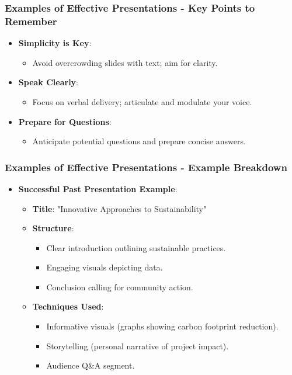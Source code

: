 \documentclass[aspectratio=169]{beamer}
\begin{document}
\begin{frame}[fragile]
    \frametitle{Examples of Effective Presentations - Key Points to Remember}
    \begin{itemize}
        \item \textbf{Simplicity is Key}:
            \begin{itemize}
                \item Avoid overcrowding slides with text; aim for clarity.
            \end{itemize}
        \item \textbf{Speak Clearly}:
            \begin{itemize}
                \item Focus on verbal delivery; articulate and modulate your voice.
            \end{itemize}
        \item \textbf{Prepare for Questions}:
            \begin{itemize}
                \item Anticipate potential questions and prepare concise answers.
            \end{itemize}
    \end{itemize}
\end{frame}

\begin{frame}[fragile]
    \frametitle{Examples of Effective Presentations - Example Breakdown}
    \begin{itemize}
        \item \textbf{Successful Past Presentation Example}:
            \begin{itemize}
                \item \textbf{Title}: "Innovative Approaches to Sustainability"
                \item \textbf{Structure}:
                    \begin{itemize}
                        \item Clear introduction outlining sustainable practices.
                        \item Engaging visuals depicting data.
                        \item Conclusion calling for community action.
                    \end{itemize}
                \item \textbf{Techniques Used}:
                    \begin{itemize}
                        \item Informative visuals (graphs showing carbon footprint reduction).
                        \item Storytelling (personal narrative of project impact).
                        \item Audience Q\&A segment.
                    \end{itemize}
            \end{itemize}
    \end{itemize}
\end{frame}
\end{document}
